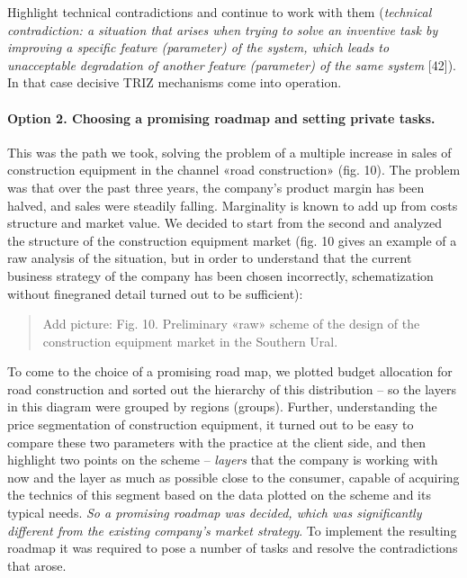 \documentclass[11pt,a4paper]{book}
\newcommand{\addpicture}[1]{
  \begin{quote} Add picture: #1\end{quote}
}
\begin{document}
Highlight technical contradictions and continue to work with them
(\emph{technical contradiction: a situation that arises when trying to solve
  an inventive task by improving a specific feature (parameter) of the system,
  which leads to unacceptable degradation of another feature (parameter) of
  the same system} [42]). In that case decisive TRIZ mechanisms come into
operation.

\paragraph{Option 2. Choosing a promising roadmap and setting private tasks.}
This was the path we took, solving the problem of a multiple increase in sales
of construction equipment in the channel «road construction» (fig. 10). The
problem was that over the past three years, the company's product margin has
been halved, and sales were steadily falling. Marginality is known to add up
from costs structure and market value. We decided to start from the second and
analyzed the structure of the construction equipment market (fig. 10 gives an
example of a raw analysis of the situation, but in order to understand that
the current business strategy of the company has been chosen incorrectly,
schematization without finegraned detail turned out to be sufficient):

\addpicture{Fig. 10. Preliminary «raw» scheme of the design of the
  construction equipment market in the Southern Ural.}

To come to the choice of a promising road map, we plotted budget allocation
for road construction and sorted out the hierarchy of this distribution -- so
the layers in this diagram were grouped by regions (groups). Further,
understanding the price segmentation of construction equipment, it turned out
to be easy to compare these two parameters with the practice at the client
side, and then highlight two points on the scheme -- \emph{layers} that the
company is working with now and the layer as much as possible close to the
consumer, capable of acquiring the technics of this segment based on the data
plotted on the scheme and its typical needs. \emph{So a promising roadmap was
  decided, which was significantly different from the existing company’s
  market strategy}. To implement the resulting roadmap it was required to pose
a number of tasks and resolve the contradictions that arose.
\end{document}
